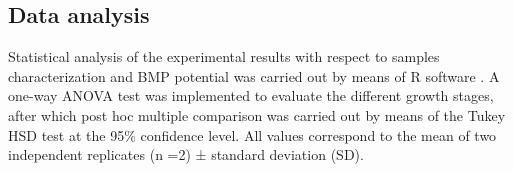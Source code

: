 \subsection{Data analysis}

Statistical analysis of the experimental results with respect to samples characterization and BMP potential was carried out by means of R software \cite{nokey_e6883}. A one-way ANOVA test was implemented to evaluate the different growth stages, after which post hoc multiple comparison was carried out by means of the Tukey HSD test at the 95\% confidence level. All values correspond to the mean of two independent replicates (n =2) ± standard deviation (SD).

